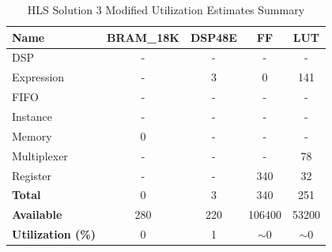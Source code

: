 \begin{table}[H]
	\centering
	\begin{tabular}{|l|c|c|c|c|}
		\hline
		\textbf{Name}    & \textbf{BRAM\_18K} & \textbf{DSP48E} & \textbf{FF} & \textbf{LUT} \\ \hline
		DSP              & -                   & -               & -           & -            \\ 
		Expression       & -                   & 3               & 0           & 141          \\ 
		FIFO             & -                   & -               & -           & -            \\ 
		Instance         & -                   & -               & -           & -            \\ 
		Memory           & 0                   & -               & -          & -            \\ 
		Multiplexer      & -                   & -               & -           & 78          \\ 
		Register         & -                   & -               & 340         & 32            \\ \hline
		\textbf{Total}   & 0                   & 3               & 340         & 251          \\ \hline
		\textbf{Available} & 280               & 220             & 106400      & 53200        \\ \hline
		\textbf{Utilization (\%)} & 0            & 1               & $\sim$0     & $\sim$0      \\ \hline
	\end{tabular}
	\caption{HLS Solution 3 Modified Utilization Estimates Summary}
	\label{tab:hls-solution-3-modified-utilization-estimates-summary}
\end{table}
